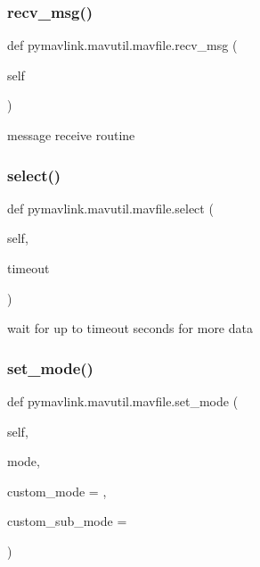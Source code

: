 \subsubsection{\texorpdfstring{recv\+\_\+msg()}{recv\_msg()}}
{\footnotesize\ttfamily def pymavlink.\+mavutil.\+mavfile.\+recv\+\_\+msg (\begin{DoxyParamCaption}\item[{}]{self }\end{DoxyParamCaption})}

\begin{DoxyVerb}message receive routine\end{DoxyVerb}
 \mbox{\label{classpymavlink_1_1mavutil_1_1mavfile_a205cfc15609088ced70b140c33c2c6d3}} 
\subsubsection{\texorpdfstring{select()}{select()}}
{\footnotesize\ttfamily def pymavlink.\+mavutil.\+mavfile.\+select (\begin{DoxyParamCaption}\item[{}]{self,  }\item[{}]{timeout }\end{DoxyParamCaption})}

\begin{DoxyVerb}wait for up to timeout seconds for more data\end{DoxyVerb}
 \mbox{\label{classpymavlink_1_1mavutil_1_1mavfile_a284eb9b6577bb9d50a67f11ce892769f}} 
\subsubsection{\texorpdfstring{set\+\_\+mode()}{set\_mode()}}
{\footnotesize\ttfamily def pymavlink.\+mavutil.\+mavfile.\+set\+\_\+mode (\begin{DoxyParamCaption}\item[{}]{self,  }\item[{}]{mode,  }\item[{}]{custom\+\_\+mode = {},  }\item[{}]{custom\+\_\+sub\+\_\+mode = {} }\end{DoxyParamCaption})}

